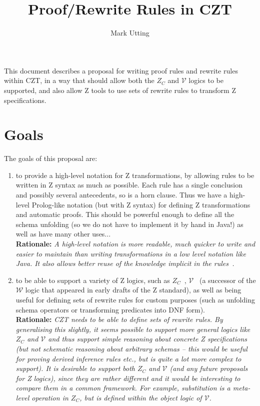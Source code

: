 \documentclass{article}
\title{Proof/Rewrite Rules in CZT}
\author{Mark Utting}
\newenvironment{Rationale}{\\ \textbf{Rationale:}\it}{}
\newcommand{\V}{\mathcal{V}}
\begin{document}
\maketitle

This document describes a proposal for writing proof rules
and rewrite rules within CZT, in a way that should allow both
the $Z_C$ and $\V$ logics to be supported, and also
allow Z tools to use sets of rewrite rules to transform Z 
specifications. 

\section{Goals}

The goals of this proposal are:
\begin{enumerate}
\item to provide a high-level notation for Z transformations,
  by allowing rules to be written in Z syntax as much as possible.
  Each rule has a single conclusion and possibly several antecedents,
  so is a horn clause.  Thus we have a high-level Prolog-like notation
  (but with Z syntax) for defining Z transformations and automatic proofs.
  This should be powerful enough to define all the schema
  unfolding  (so we do not have to implement
  it by hand in Java!) as well as have many other uses...
  \begin{Rationale}
    A high-level notation is more readable, much quicker
    to write and easier to maintain than writing transformations in
    a low level notation like Java.  It also allows better reuse of the
    knowledge implicit in the rules~\cite{DenningACM}.
  \end{Rationale}

\item to be able to support a variety of Z logics, such as
  $Z_C$~\cite{henson:revising-z-1-99,henson:revising-z-2-99}, 
  $\mathcal{V}$~\cite{brien:calculus-schemas-z00} (a successor of
  the $\mathcal{W}$ logic that appeared in early drafts of the Z standard),
  as well as being useful for defining sets of rewrite rules
  for custom purposes (such as unfolding schema operators
  or transforming predicates into DNF form).
  \begin{Rationale}
    CZT needs to be able to define sets of rewrite rules.
    By generalising this slightly, it seems possible to support more
    general logics like $Z_C$ and $\mathcal{V}$ and thus support simple
    reasoning about concrete Z specifications (but not schematic
    reasoning about arbitrary schemas -- this would be useful for proving
    derived inference rules etc., but is quite a lot more complex
    to support).  It is desirable to 
    support both $Z_C$ and $\mathcal{V}$ (and any future proposals for Z
    logics), since they are rather different and it would be interesting
    to compare them in a common framework.  For example, substitution
    is a meta-level operation in $Z_C$, but is defined within the object
    logic of $\mathcal{V}$.
  \end{Rationale}


\end{enumerate}
\end{document}
